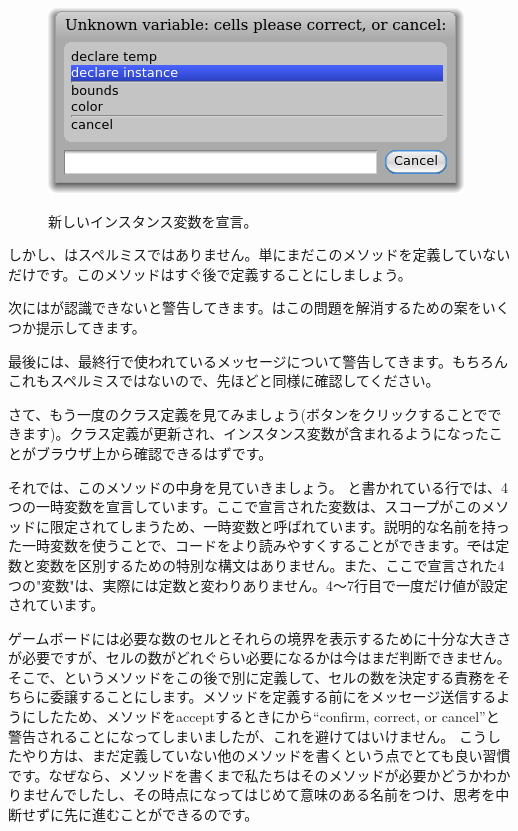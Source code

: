 \documentclass[a4paper,10pt,twoside]{book}
\begin{document}
\begin{figure}[htb]
\begin{minipage}{0.48\textwidth}
		{\includegraphics[scale=0.7]{DeclareInstanceVar}}
	\caption{新しいインスタンス変数を宣言。}
\end{minipage}
\end{figure}

しかし、はスペルミスではありません。単にまだこのメソッドを定義していないだけです。このメソッドはすぐ後で定義することにしましょう。


次に\pharo はが認識できないと警告してきます。\pharo はこの問題を解消するための案をいくつか提示してきます。


最後に\pharo は、最終行で使われているメッセージについて警告してきます。もちろんこれもスペルミスではないので、先ほどと同様に確認してください。


さて、もう一度のクラス定義を見てみましょう(ボタンをクリックすることでできます)。クラス定義が更新され、インスタンス変数が含まれるようになったことがブラウザ上から確認できるはずです。

それでは、このメソッドの中身を見ていきましょう。
と書かれている行では、4つの一時変数を宣言しています。ここで宣言された変数は、スコープがこのメソッドに限定されてしまうため、一時変数と呼ばれています。説明的な名前を持った一時変数を使うことで、コードをより読みやすくすることができます。\st では定数と変数を区別するための特別な構文はありません。また、ここで宣言された4つの"変数"は、実際には定数と変わりありません。4〜7行目で一度だけ値が設定されています。

ゲームボードには必要な数のセルとそれらの境界を表示するために十分な大きさが必要ですが、セルの数がどれぐらい必要になるかは今はまだ判断できません。そこで、というメソッドをこの後で別に定義して、セルの数を決定する責務をそちらに委譲することにします。メソッドを定義する前にをメッセージ送信するようにしたため、メソッドをacceptするときに\pharo から``confirm, correct, or cancel''と警告されることになってしまいましたが、これを避けてはいけません。
こうしたやり方は、まだ定義していない他のメソッドを書くという点でとても良い習慣です。なぜなら、メソッドを書くまで私たちはそのメソッドが必要かどうかわかりませんでしたし、その時点になってはじめて意味のある名前をつけ、思考を中断せずに先に進むことができるのです。
\end{document}
